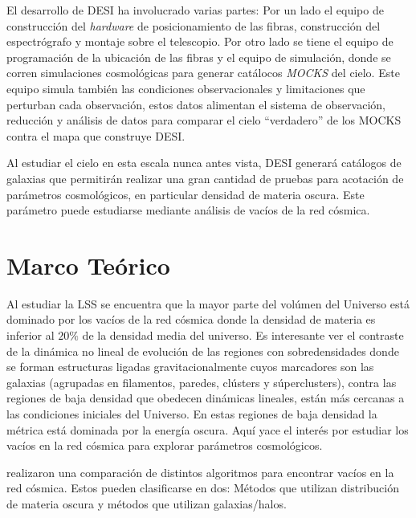 \documentclass[preprint]{aastex62}
\begin{document}
  El desarrollo de DESI ha involucrado varias partes: Por un lado el equipo de construcción
  del \textit{hardware} de posicionamiento de las fibras, construcción del espectrógrafo y
  montaje sobre el telescopio. Por otro lado se tiene el equipo de programación de la ubicación
  de las fibras y el equipo de simulación, donde se corren simulaciones cosmológicas para
  generar catálocos \textit{MOCKS} del cielo. Este equipo simula también las condiciones
  observacionales y limitaciones que perturban cada observación, estos datos alimentan el sistema
  de observación, reducción y análisis de datos para comparar el cielo ``verdadero'' de
  los MOCKS contra el mapa que construye DESI.

  Al estudiar el cielo en esta escala nunca antes vista, DESI generará catálogos de galaxias
  que permitirán realizar una gran cantidad de pruebas para acotación de parámetros cosmológicos,
  en particular densidad de materia oscura. Este parámetro puede estudiarse mediante análisis
  de vacíos de la red cósmica.


  \section{Marco Teórico}

  Al estudiar la LSS se encuentra que la mayor parte del volúmen del Universo está dominado
  por los vacíos de la red cósmica donde la densidad de materia es inferior al $20\%$ de la
  densidad media del universo. Es interesante ver el contraste de la dinámica no lineal de evolución de
  las regiones con sobredensidades donde se forman estructuras ligadas gravitacionalmente
  cuyos marcadores son las galaxias (agrupadas en filamentos, paredes, clústers y súperclusters),
  contra las regiones de baja densidad que obedecen dinámicas lineales, están más cercanas a
  las condiciones iniciales del Universo. En estas regiones de baja densidad la métrica está
  dominada por la energía oscura. Aquí yace el interés por estudiar los vacíos en la
  red cósmica para explorar parámetros cosmológicos.

  
  \citet{Aspen-Amsterdam2008} realizaron una comparación de distintos algoritmos para encontrar vacíos
  en la red cósmica. Estos pueden clasificarse en dos: Métodos que utilizan distribución de materia
  oscura y métodos que utilizan galaxias/halos.
\end{document}
